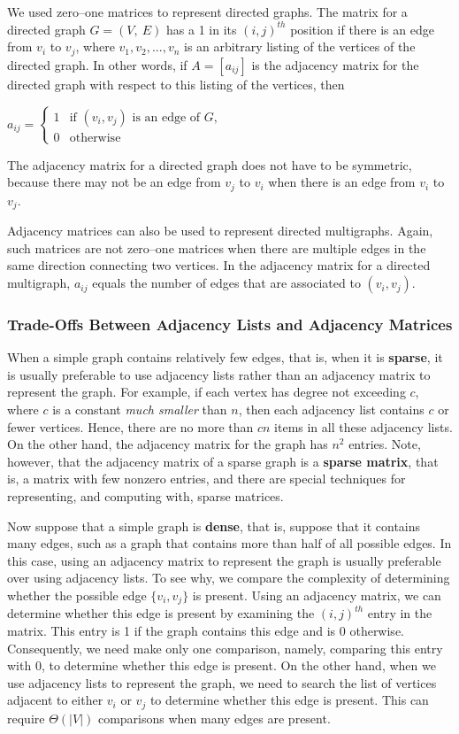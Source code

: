 \documentclass[11pt]{article}
\begin{document}
We used zero–one matrices to represent directed graphs. The matrix for a directed graph $G = (V,\ E)$ has a 1 in its $(i, j)^{th}$ position if there is an edge from $v_i$ to $v_j$, where $v_1, v_2, ..., v_n$ is an arbitrary listing of the vertices of the directed graph. In other words, if $A = [a_{ij}]$ is the adjacency matrix for the directed graph with respect to this listing of the vertices, then

$a_{ij} =
    \begin{cases}
        1 & \text{if $(v_i, v_j)$ is an edge of $G$},\\
        0 & \text{otherwise}
    \end{cases}$
    
\noindent The adjacency matrix for a directed graph does not have to be symmetric, because there may not be an edge from $v_j$ to $v_i$ when there is an edge from $v_i$ to $v_j$.

Adjacency matrices can also be used to represent directed multigraphs. Again, such matrices are not zero–one matrices when there are multiple edges in the same direction connecting two vertices. In the adjacency matrix for a directed multigraph, $a_{ij}$ equals the number of edges that are associated to $(v_i, v_j)$.

\subsubsection{Trade-Offs Between Adjacency Lists and Adjacency Matrices}

When a simple graph contains relatively few edges, that is, when it is \textbf{sparse}, it is usually preferable to use adjacency lists rather than an adjacency matrix to represent the graph. For example, if each vertex has degree not exceeding $c$, where $c$ is a constant \textit{much smaller} than $n$, then each adjacency list contains $c$ or fewer vertices. Hence, there are no more than $cn$ items in all these adjacency lists. On the other hand, the adjacency matrix for the graph has $n^2$ entries. Note, however, that the adjacency matrix of a sparse graph is a \textbf{sparse matrix}, that is, a matrix with few nonzero entries, and there are special techniques for representing, and computing with, sparse matrices.

Now suppose that a simple graph is \textbf{dense}, that is, suppose that it contains many edges, such as a graph that contains more than half of all possible edges. In this case, using an adjacency matrix to represent the graph is usually preferable over using adjacency lists. To see why, we compare the complexity of determining whether the possible edge $\{v_i, v_j\}$ is present. Using an adjacency matrix, we can determine whether this edge is present by examining the $(i, j)^{th}$ entry in the matrix. This entry is 1 if the graph contains this edge and is 0 otherwise. Consequently, we need make only one comparison, namely, comparing this entry with 0, to determine whether this edge is present. On the other hand, when we use adjacency lists to represent the graph, we need to search the list of vertices adjacent to either $v_i$ or $v_j$ to determine whether this edge is present. This can require $\Theta(|V|)$ comparisons when many edges are present.
\end{document}
